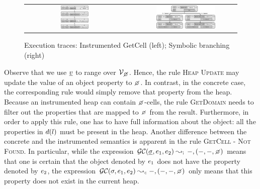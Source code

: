  
\setcounter{figure}{4}   
\begin{figure}[!t]
\centering
\begin{tabular}{c||c}
\includegraphics[width=0.28\textwidth]{figures/domaintable.png} \ & \ \includegraphics[width=0.59\textwidth]{figures/symbSemEx.png}
\end{tabular}
\vspace*{-0.3cm}
\caption{Execution traces: Instrumented GetCell (left); Symbolic branching (right)}
\label{fig:sexecexample}
\vspace*{-0.4cm}
\end{figure}


Observe that we use $\underline{v}$ to range over $\setext{\vals}{\none}$. 
Hence, the rule \textsc{Heap Update} may update the value of an object property to $\none$.  
In contrast, in the concrete case, the corresponding rule would simply remove that property from the heap.  
 Because an instrumented heap can contain $\none$-cells, the rule \textsc{GetDomain} needs to filter out the properties that are mapped to $\none$ from the result. 
 Furthermore, in order to apply this rule, one has to have full information about the object: all the properties in $d(l)$ must be present in the heap. 
%
Another difference between the concrete and the instrumented semantics is apparent in the rule \textsc{GetCell - Not Found}. 
In particular, while the expression $\absgetcellrule{\instrumented}{\istate, \jsilexpr_1, \jsilexpr_2}{-, (-, -, \none)}$ 
means that one is certain that the object denoted by $e_1$ does not have the property 
denoted by $e_2$, the expression $\absgetcellrule{\concrete}{\jstate, \jsilexpr_1, \jsilexpr_2}{-, (-, -, \none)}$ 
only means that this property does not exist in the current heap. %
%

